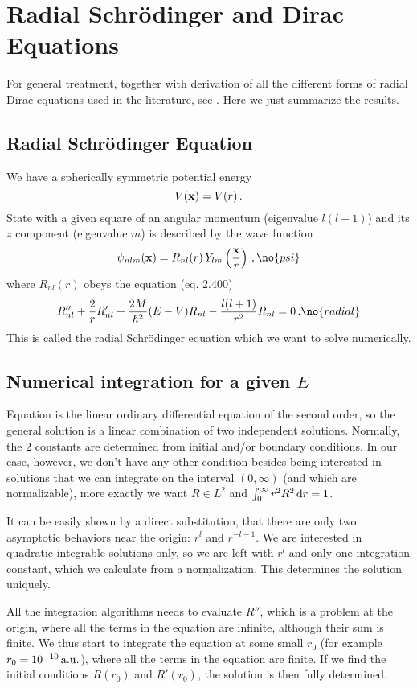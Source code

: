 \section{Radial Schr\"odinger and Dirac Equations}

For general treatment, together with derivation of all the different forms of
radial Dirac equations used in the literature, see \cite{bachelor-thesis}. Here
we just summarize the results.

\subsection{Radial Schr\"odinger Equation}

We have a spherically symmetric potential energy
$$V({\bf x})=V(r)\,.$$
State with a given square of an angular momentum (eigenvalue
$l(l+1)$) and its $z$ component (eigenvalue $m$) is described by the wave
function
$$\psi_{nlm}({\bf x})=R_{nl}(r)\,Y_{lm}\left({\bf x}\over r\right)\,,\no{psi}$$
where $R_{nl}(r)$ obeys the equation \cite{formanek} (eq. 2.400)
$$R_{nl}''+{2\over r}R_{nl}'+{2M\over\hbar^2}(E-V)R_{nl}-
{l(l+1)\over r^2}R_{nl}=0\,.\no{radial}$$
This is called the radial Schr\"odinger equation which
we want to solve numerically.

\subsection{Numerical integration for a given $E$}

Equation  is the linear ordinary differential equation of the second
order, so the general solution is a linear combination of two independent
solutions. Normally, the $2$ constants are determined from initial and/or
boundary conditions. In our case, however, we don't have any other condition
besides being interested in solutions that we can integrate on the interval
$(0,\infty)$ (and which are normalizable), more exactly we want
$R\in L^2$ and $\int_0^\infty r^2R^2\,{\rm d} r=1$. 

It can be easily shown by a direct substitution, that there are only two
asymptotic behaviors near the origin: $r^l$ and $r^{-l-1}$. We are interested
in quadratic integrable solutions only, so we are left with $r^l$
and only one integration constant, which we calculate from a normalization.
This determines the solution uniquely.

All the integration algorithms needs to evaluate $R''$, which is a
problem at the origin, where all the terms in the equation are infinite,
although their sum is finite. We thus start to integrate the equation at some
small $r_0$ (for example $r_0=10^{-10}\rm\,a.u.$), where all the terms in the
equation are finite. If we find the initial conditions $R(r_0)$ and
$R'(r_0)$, the solution is then fully determined.

